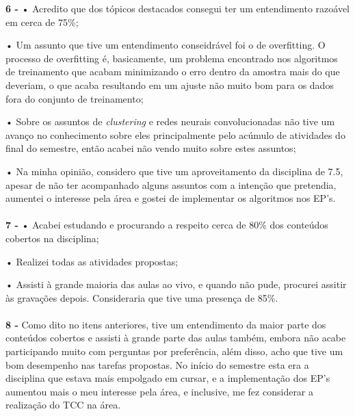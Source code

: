 \documentclass[10pt,a4paper]{article}
\begin{document}
\textbf{6 - }
• Acredito que dos tópicos destacados consegui ter um entendimento razoável em cerca de 75\%;

• Um assunto que tive um entendimento conseidrável foi o de overfitting. O processo de overfitting é, basicamente, um problema encontrado nos algoritmos de treinamento que acabam minimizando o erro dentro da amostra mais do que deveriam, o que acaba resultando em um ajuste não muito bom para os dados fora do conjunto de treinamento;

• Sobre os assuntos de \textit{clustering} e redes neurais convolucionadas não tive um avanço no conhecimento sobre eles principalmente pelo acúmulo de atividades do final do semestre, então acabei não vendo muito sobre estes assuntos;

• Na minha opinião, considero que tive um aproveitamento da disciplina de 7.5, apesar de não ter acompanhado alguns assuntos com a intenção que pretendia, aumentei o interesse pela área e gostei de implementar os algoritmos nos EP's. \\ \\

\textbf{7 - } • Acabei estudando e procurando a respeito cerca de 80\% dos conteúdos cobertos na disciplina;

• Realizei todas as atividades propostas;

• Assisti à grande maioria das aulas ao vivo, e quando não pude, procurei assitir às gravações depois. Consideraria que tive uma presença de 85\%. \\ \\

\textbf{8 - } Como dito no itens anteriores, tive um entendimento da maior parte dos conteúdos cobertos e assisti à grande parte das aulas também, embora não acabe participando muito com perguntas por preferência, além disso, acho que tive um bom desempenho nas tarefas propostas. No início do semestre esta era a disciplina que estava mais empolgado em cursar, e a implementação dos EP's aumentou mais o meu interesse pela área, e inclusive, me fez considerar a realização do TCC na área.
\end{document}
